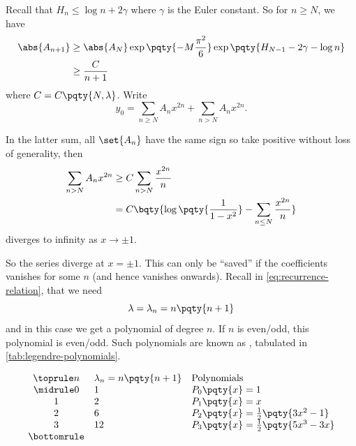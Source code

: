 Recall that \(H_n \leq \log n + 2 \gamma\) where \(\gamma\) is the Euler constant. So for \(n \geq N\), we have
\begin{subequations}
    \begin{align}
        \abs{A_{n + 1}} &\geq \abs{A_N} \exp\pqty{- M \frac{\pi^2}{6}} \exp\pqty{H_{N - 1} - 2 \gamma - \log n} \\
        &\geq \frac{C}{n + 1}
    \end{align}
\end{subequations}
where \(C = C\pqty{N, \lambda}\). Write
\begin{equation}
    y_0 = \sum_{n \geq N} A_n x^{2n} + \sum_{n > N} A_n x^{2n}.
\end{equation}

In the latter sum, all \(\set{A_n}\) have the same sign so take positive without loss of generality, then
\begin{subequations}
    \begin{align}
        \sum_{n > N} A_n x^{2n} &\geq C \sum_{n > N} \frac{x^{2n}}{n} \\
        &= C\bqty{\log \pqty{\frac{1}{1 - x^2}} - \sum_{n \leq N} \frac{x^{2n}}{n}}
    \end{align}
\end{subequations}
diverges to infinity as \(x \to \pm 1\).

\normalsize

So the series diverge at \(x = \pm 1\). This can only be ``saved'' if the coefficients vanishes for some \(n\) (and hence vanishes onwards). Recall in \eqref{eq:recurrence-relation}, that we need
\begin{equation}
    \lambda = \lambda_n = n \pqty{n + 1}
\end{equation}
and in this case we get a polynomial of degree \(n\). If \(n\) is even/odd, this polynomial is even/odd. Such polynomials are known as , tabulated in \autoref{tab:legendre-polynomials}.

\begin{table}[ht!]
    \centering
    \caption{Legendre Polynomials}
    \label{tab:legendre-polynomials}
    \[
        \begin{array}{cll}
            \toprule
            n & \lambda_n = n \pqty{n + 1} & \text{Polynomials} \\
            \midrule
            0 & 1 & P_0 \pqty{x} = 1 \\
            1 & 2 & P_1 \pqty{x} = x \\
            2 & 6 & P_2 \pqty{x} = \frac{1}{2} \pqty{3 x^2 - 1} \\
            3 & 12 & P_3 \pqty{x} = \frac{1}{2} \pqty{5 x^3 - 3x} \\
            \bottomrule
        \end{array}
    \]
\end{table}

